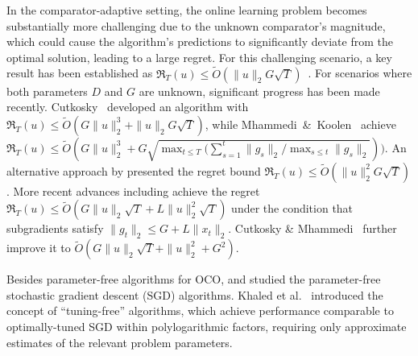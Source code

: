 \documentclass{article}
\renewcommand{\citet}{\citep}
\theoremstyle{plain}
\theoremstyle{definition}
\theoremstyle{remark}
\newcommand{\regret}{\mathfrak{R}}
\renewcommand{\tilde}{\widetilde}
\begin{document}
In the comparator-adaptive setting, the online learning problem becomes substantially more challenging due to the unknown comparator's magnitude, which could cause the algorithm's predictions to significantly deviate from the optimal solution, leading to a large regret. %
For this challenging scenario, a key result has been established as $\regret_T(u)\leq \tilde{O}(\|u\|_2G\sqrt{T})$~\cite{foster2015adaptive,orabona2016coin,cutkosky2018black,jacobsen2022parameter}. For scenarios where both parameters $D$ and $G$ are unknown, significant progress has been made recently. Cutkosky~\citet{cutkosky2019artificial} developed an algorithm with $\regret_T(u)\leq \tilde{O}(G\|u\|_2^3+\|u\|_2 G\sqrt{T})$, while  Mhammedi~\&~Koolen~\citet{mhammedi2020lipschitz} achieve $\regret_T(u)\leq \tilde{O}(G\|u\|_2^3+G\sqrt{\max_{t\leq T}(\sum_{s=1}^t\|g_s\|_2/\max_{s\leq t}\|g_s\|_2}))$. An alternative approach by \citet{orabona2018scale} presented the regret bound $\regret_T(u)\leq \tilde{O}(\|u\|_2^2G\sqrt{T})$. More recent advances including  \citet{jacobsen2023unconstrained} achieve the regret $\regret_T(u)\leq \tilde{O}(G\|u\|_2\sqrt{T}+L\|u\|_2^2\sqrt{T})$ under the condition that subgradients satisfy $\|g_t\|_2\leq G+L\|x_t\|_2$.  Cutkosky \& Mhammedi~\citet{cutkosky2024fully} further improve it to $\tilde{O}(G\|u\|_2\sqrt{T}+\|u\|_2^2+G^2)$.

Besides  parameter-free algorithms for OCO, \citet{ivgi2023dog} and \citet{khaled2023dowg} studied the parameter-free stochastic gradient descent (SGD) algorithms. Khaled et al.~\citet{khaled2024tuning} introduced the concept of ``tuning-free'' algorithms, which achieve performance comparable to optimally-tuned SGD within polylogarithmic factors, requiring only approximate estimates of the relevant problem parameters.

\end{document}
